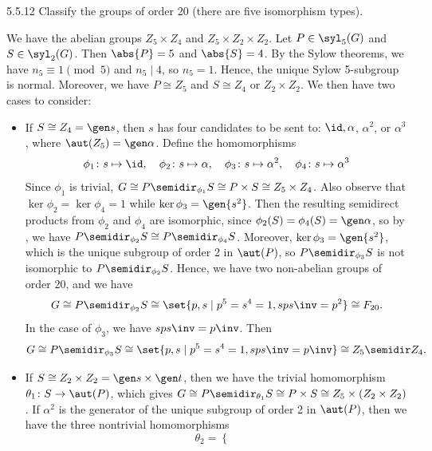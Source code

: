 \begin{exercise}{5.5.12}
    Classify the groups of order 20 (there are five isomorphism types).
\end{exercise}

\begin{sol}
    We have the abelian groups $Z_5 \times Z_4$ and $Z_5 \times Z_2 \times Z_2$.
	Let $P \in \syl_5(G)$ and $S \in \syl_2(G)$.
	Then $\abs{P} = 5$ and $\abs{S} = 4$.
	By the Sylow theorems, we have $n_5 \equiv 1 \pmod 5$ and $n_5 \mid 4$, so $n_5 = 1$.
	Hence, the unique Sylow 5-subgroup is normal.
	Moreover, we have $P \cong Z_5$ and $S \cong Z_4$ or $Z_2 \times Z_2$.
	We then have two cases to consider:
    \begin{itemize}
        \item If $S \cong Z_4 = \gen s$, then $s$ has four candidates to be sent to: $\id, \alpha$, $\alpha^2$, or $\alpha^3$, where $\aut(Z_5) = \gen\alpha$.
	    Define the homomorphisms
        \[
        	\phi_1 \colon s \mapsto \id, \quad \phi_2 \colon s \mapsto \alpha, \quad \phi_3 \colon s \mapsto \alpha^2, \quad \phi_4 \colon s \mapsto \alpha^3
        \]
        Since $\phi_1$ is trivial, $G \cong P \semidir_{\phi_1} S \cong P \times S \cong Z_5 \times Z_4$.
        Also observe that $\ker\phi_2 = \ker\phi_4 = 1$ while $\ker\phi_3 = \gen{s^2}$.
        Then the resulting semidirect products from $\phi_2$ and $\phi_4$ are isomorphic, since $\phi_2(S) = \phi_4(S) = \gen\alpha$, so by , we have $P \semidir_{\phi_2} S \cong P \semidir_{\phi_4} S$.
        Moreover, $\ker\phi_3 = \gen{s^2}$, which is the unique subgroup of order 2 in $\aut(P)$, so $P \semidir_{\phi_3} S$ is not isomorphic to $P \semidir_{\phi_2} S$.
        Hence, we have two non-abelian groups of order 20, and we have
        \[
        	G \cong P \semidir_{\phi_2} S \cong \set{p, s \mid p^5 = s^4 = 1, sps\inv = p^2} \cong F_{20}.
        \]
        In the case of $\phi_3$, we have $sps\inv = p\inv$.
	    Then
        \[
        	G \cong P \semidir_{\phi_3} S \cong \set{p, s \mid p^5 = s^4 = 1, sps\inv = p\inv} \cong Z_5 \semidir Z_4.
        \]
        \item If $S \cong Z_2 \times Z_2 = \gen s \times \gen t$, then we have the trivial homomorphism $\theta_1 \colon S \to \aut(P)$, which gives $G \cong P \semidir_{\theta_1} S \cong P \times S \cong Z_5 \times (Z_2 \times Z_2)$.
	    If $\alpha^2$ is the generator of the unique subgroup of order 2 in $\aut(P)$, then we have the three nontrivial homomorphisms
        \[
        	\theta_2 = 
            \begin{cases}

\end{cases}\]
\end{itemize}
\end{sol}
